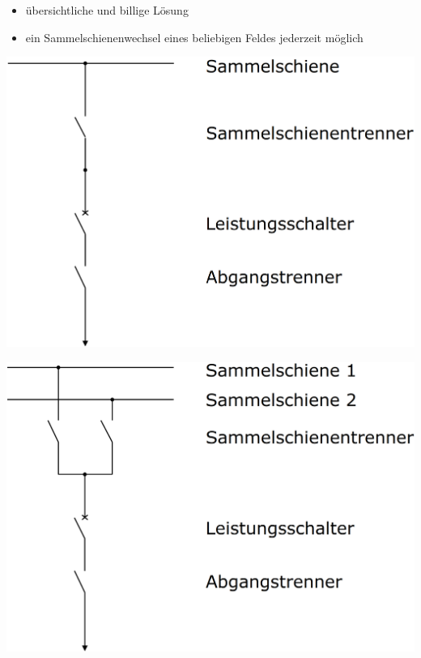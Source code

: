 \begin{minipage}[c]{0.48\columnwidth}
    \begin{itemize}
        \item übersichtliche und billige Lösung
    \end{itemize}
\end{minipage}
\hfill
\begin{minipage}[c]{0.48\columnwidth}
    \begin{itemize}
        \item ein Sammelschienenwechsel eines beliebigen Feldes jederzeit möglich
    \end{itemize}
\end{minipage}

\vspace{0.15cm}

\begin{minipage}[c]{0.48\columnwidth}
    \begin{center}
        \includegraphics[width=0.98\columnwidth]{images/Einfachsammelschiene.png}
    \end{center}
\end{minipage}
\hfill
\begin{minipage}[c]{0.48\columnwidth}
    \begin{center}
        \includegraphics[width=0.98\columnwidth]{images/Doppelsammelschiene.png}
    \end{center}
\end{minipage}

